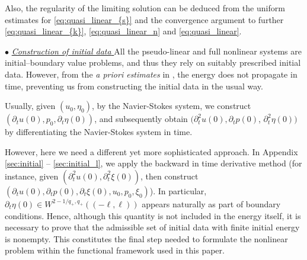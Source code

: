 \documentclass[letterpaper,reqno,10pt,twoside]{amsart}
\theoremstyle{definition}
\theoremstyle{remark}
\def\p{\partial}
\begin{document}
	
	
	Also, the regularity of the limiting solution can be deduced from the uniform estimates for \eqref{eq:quasi_linear_{s}} and the convergence argument to further \eqref{eq:quasi_linear_{k}}, \eqref{eq:quasi_linear_n} and \eqref{eq:quasi_linear}.
	
	\noindent  $\bullet$ \underline{\textsl{Construction of initial data} }
	All the pseudo-linear and full nonlinear systems are initial--boundary value problems, and thus they rely on suitably prescribed initial data. However, from the \textit{a priori estimates} in \cite{GT2020}, the energy does not propagate in time, preventing us from constructing the initial data in the usual way. 
	
	Usually, given $(u_0, \eta_0)$, by the Navier-Stokes system, we construct $(\p_tu(0), p_0, \p_t\eta(0))$, and subsequently obtain $(\p_t^2u(0), \p_tp(0)$, $\p_t^2\eta(0))$ by differentiating the Navier-Stokes system in time. 
	
	However, here we need a different yet more sophisticated approach. In Appendix \ref{sec:initial} -- \ref{sec:initial_l}, we apply the backward in time derivative method (for instance, given $(\p_t^2u(0), \p_t^2\xi(0))$, then construct $(\p_tu(0), \p_tp(0), \p_t\xi(0), u_0, p_0, \xi_0)$). In particular, $\p_t\eta(0) \in W^{2-1/q_{+}, q_{+}}((-\ell, \ell))$ appears naturally as part of boundary conditions. Hence, although this quantity is not included in the energy itself, it is necessary to prove that the admissible set of initial data with finite initial energy is nonempty. This constitutes the final step needed to formulate the nonlinear problem within the functional framework used in this paper.
	
	
\end{document}
